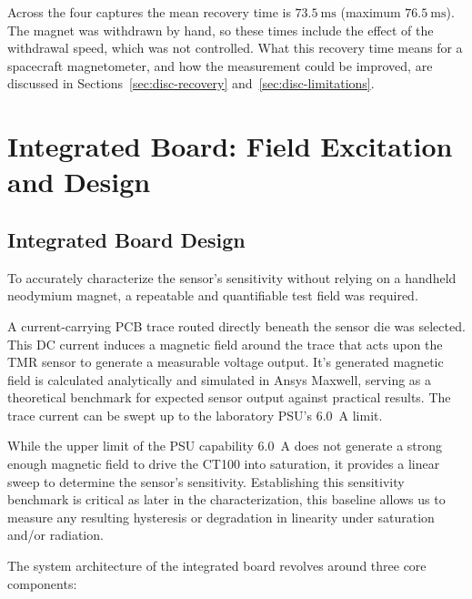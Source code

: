 \documentclass[12pt,a4paper]{article}
\begin{document}
Across the four captures the mean recovery time is $\SI{73.5}{\milli\second}$ (maximum $\SI{76.5}{\milli\second}$). The magnet was withdrawn by hand, so these times include the effect of the withdrawal speed, which was not controlled. What this recovery time means for a spacecraft magnetometer, and how the measurement could be improved, are discussed in Sections~\ref{sec:disc-recovery} and~\ref{sec:disc-limitations}.


\section{Integrated Board: Field Excitation and Design}
\label{sec:integrated-board}

\subsection{Integrated Board Design}
\label{sec:integrated-design}

To accurately characterize the sensor's sensitivity without relying on a handheld neodymium magnet, a repeatable and quantifiable test field was required.

A current-carrying PCB trace routed directly beneath the sensor die was selected. This DC current induces a magnetic field around the trace that acts upon the TMR sensor to generate a measurable voltage output. It's generated magnetic field is calculated analytically and simulated in Ansys Maxwell, serving as a theoretical benchmark for expected sensor output against practical results. The trace current can be swept up to the laboratory PSU's \SI{6.0}{\ampere} limit. 

While the upper limit of the PSU capability \SI{6.0}{\ampere}  does not generate a strong enough magnetic field to drive the CT100 into saturation, it provides a linear sweep to determine the sensor's sensitivity. Establishing this sensitivity benchmark is critical as later in the characterization, this baseline allows us to measure any resulting hysteresis or degradation in linearity under saturation and/or radiation.

The system architecture of the integrated board revolves around three core components:
\end{document}
